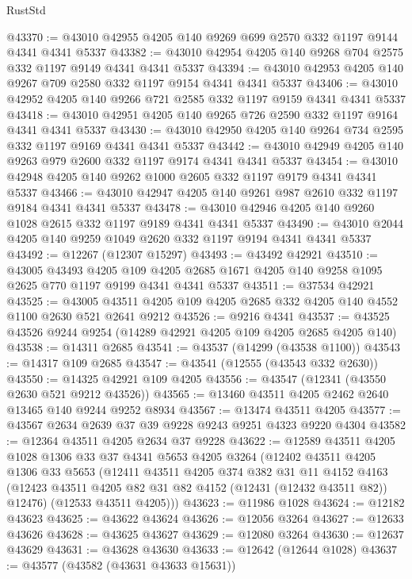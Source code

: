 \begin{lexlean}{RustStd}
\begin{coremodule}
@43370 := @43010 @42955 @4205 @140 @9269 @699 @2570 @332 @1197 @9144 @4341 @4341 @5337
@43382 := @43010 @42954 @4205 @140 @9268 @704 @2575 @332 @1197 @9149 @4341 @4341 @5337
@43394 := @43010 @42953 @4205 @140 @9267 @709 @2580 @332 @1197 @9154 @4341 @4341 @5337
@43406 := @43010 @42952 @4205 @140 @9266 @721 @2585 @332 @1197 @9159 @4341 @4341 @5337
@43418 := @43010 @42951 @4205 @140 @9265 @726 @2590 @332 @1197 @9164 @4341 @4341 @5337
@43430 := @43010 @42950 @4205 @140 @9264 @734 @2595 @332 @1197 @9169 @4341 @4341 @5337
@43442 := @43010 @42949 @4205 @140 @9263 @979 @2600 @332 @1197 @9174 @4341 @4341 @5337
@43454 := @43010 @42948 @4205 @140 @9262 @1000 @2605 @332 @1197 @9179 @4341 @4341 @5337
@43466 := @43010 @42947 @4205 @140 @9261 @987 @2610 @332 @1197 @9184 @4341 @4341 @5337
@43478 := @43010 @42946 @4205 @140 @9260 @1028 @2615 @332 @1197 @9189 @4341 @4341 @5337
@43490 := @43010 @2044 @4205 @140 @9259 @1049 @2620 @332 @1197 @9194 @4341 @4341 @5337
@43492 := @12267 (@12307 @15297)
@43493 := @43492 @42921
@43510 := @43005
    @43493
    @4205
    @109
    @4205
    @2685
    @1671
    @4205
    @140
    @9258
    @1095
    @2625
    @770
    @1197
    @9199
    @4341
    @4341
    @5337
@43511 := @37534 @42921
@43525 := @43005 @43511 @4205 @109 @4205 @2685 @332 @4205 @140 @4552 @1100 @2630 @521 @2641 @9212
@43526 := @9216 @4341
@43537 := @43525 @43526 @9244 @9254 (@14289 @42921 @4205 @109 @4205 @2685 @4205 @140)
@43538 := @14311 @2685
@43541 := @43537 (@14299 (@43538 @1100))
@43543 := @14317 @109 @2685
@43547 := @43541 (@12555 (@43543 @332 @2630))
@43550 := @14325 @42921 @109 @4205
@43556 := @43547 (@12341 (@43550 @2630 @521 @9212 @43526))
@43565 := @13460 @43511 @4205 @2462 @2640 @13465 @140 @9244 @9252 @8934
@43567 := @13474 @43511 @4205
@43577 := @43567 @2634 @2639 @37 @39 @9228 @9243 @9251 @4323 @9220 @4304
@43582 := @12364 @43511 @4205 @2634 @37 @9228
@43622 := @12589
    @43511
    @4205
    @1028
    @1306
    @33
    @37
    @4341
    @5653
    @4205
    @3264
    (@12402
      @43511
      @4205
      @1306
      @33
      @5653
      (@12411
        @43511
        @4205
        @374
        @382
        @31
        @11
        @4152
        @4163
        (@12423 @43511 @4205 @82 @31 @82 @4152 (@12431 (@12432 @43511 @82)) @12476)
        (@12533 @43511 @4205)))
@43623 := @11986 @1028
@43624 := @12182 @43623
@43625 := @43622 @43624
@43626 := @12056 @3264
@43627 := @12633 @43626
@43628 := @43625 @43627
@43629 := @12080 @3264
@43630 := @12637 @43629
@43631 := @43628 @43630
@43633 := @12642 (@12644 @1028)
@43637 := @43577 (@43582 (@43631 @43633 @15631))

\end{coremodule}
\end{lexlean}
